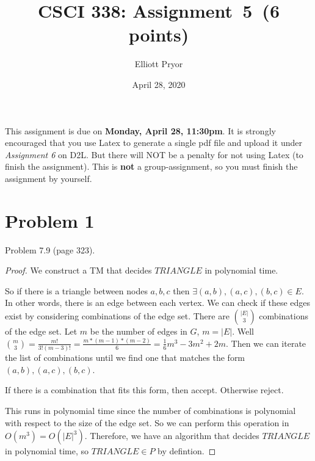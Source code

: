 \documentclass[11pt]{article}
\begin{document}
\date{April 28, 2020}
\title{CSCI 338: Assignment~5~(6 points)}

\author{Elliott Pryor}


\maketitle

\noindent
This assignment is due on {\bf Monday, April 28, 11:30pm}. It is strongly
encouraged that you use Latex to generate a single pdf file and upload it
under {\em Assignment 6} on D2L. But there will NOT be a penalty for not
using Latex (to finish the assignment). This is {\bf not} a group-assignment,
so you must finish the assignment by yourself.

\section*{Problem 1}

Problem 7.9 (page 323).
\newline


\begin{proof}


We construct a TM that decides $TRIANGLE$ in polynomial time. 

So if there is a triangle between nodes $a, b, c$ then $\exists (a, b), (a,c), (b, c) \in E$. In other words, there is an edge between each vertex. We can check if these edges exist by considering combinations of the edge set. There are ${|E| \choose 3}$ combinations of the edge set. Let $m$ be the number of edges in $G$, $m = |E|$.  Well ${m \choose 3 } = \frac{m!}{3! (m - 3)!} = \frac{m * (m-1) * (m-2)}{6} = \frac{1}{6} m^3 - 3m^2 + 2m$. Then we can iterate the list of combinations until we find one that matches the form $(a, b), (a,c), (b, c)$. 

If there is a combination that fits this form, then accept. Otherwise reject.

This runs in polynomial time since the number of combinations is polynomial with respect to the size of the edge set. So we can perform this operation in $O(m^3) = O(|E|^3)$. Therefore, we have an algorithm that decides $TRIANGLE$ in polynomial time, so $TRIANGLE \in P$ by defintion.

\end{proof}
\end{document}
